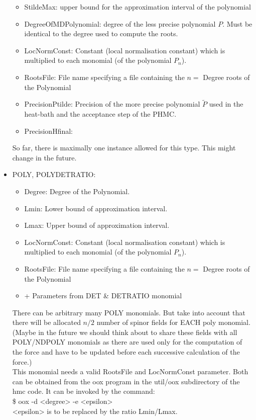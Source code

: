 \begin{itemize}
\begin{itemize}
  \item {\ttfamily StildeMax}:
    upper bound for the approximation interval of the polynomial

  \item {\ttfamily DegreeOfMDPolynomial}:
    degree of the less precise polynomial $P$. Must be identical to the
    degree used to compute the roots.

  \item {\ttfamily LocNormConst}:
    Constant (local normalisation constant) which is multiplied to each monomial (of the polynomial $P_n$).
  \item {\ttfamily RootsFile}:
    File name specifying a file containing the $n=$ {\ttfamily Degree} roots of the Polynomial

  \item {\ttfamily PrecisionPtilde}:
    Precision of the more precise polynomial $\tilde P$ used in the
    heat-bath and the acceptance step of the PHMC.

  \item {\ttfamily PrecisionHfinal}:
  \end{itemize}
  So far, there is maximally one instance allowed for this type. This
  might change in the future.
\item {\ttfamily POLY, POLYDETRATIO}:
  \begin{itemize}
  \item {\ttfamily Degree}:
    Degree of the Polynomial.
  \item {\ttfamily Lmin}:
    Lower bound of approximation interval.
  \item {\ttfamily Lmax}:
    Upper bound of approximation interval.
  \item {\ttfamily LocNormConst}:
    Constant (local normalisation constant) which is multiplied to each monomial (of the polynomial $P_n$).
  \item {\ttfamily RootsFile}:
    File name specifying a file containing the $n=$ {\ttfamily Degree} roots of the Polynomial
  \item {\ttfamily + Parameters from DET \& DETRATIO monomial}
  \end{itemize}
There can be arbitrary many POLY monomials. But take into account that there will be allocated $n/2$ number of spinor fields for EACH poly monomial. (Maybe in the future we should think about to share these fields with all POLY/NDPOLY monomials as there are used only for the computation of the force and have to be updated before each successive calculation of the force.)\\
This monomial needs a valid {\ttfamily RootsFile} and {\ttfamily LocNormConst} parameter. Both can be obtained from the {\ttfamily oox} program in the {\ttfamily util/oox} subdirectory of the hmc code. It can be invoked by the command:\\
{\ttfamily \$ oox -d <degree> -e <epsilon>}\\
{\ttfamily <epsilon>} is to be replaced by the ratio  {\ttfamily Lmin/Lmax}.
\end{itemize}

